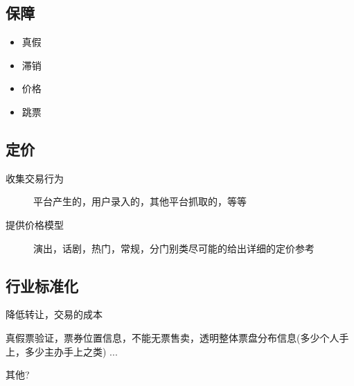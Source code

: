 \documentclass[11pt,a4paper]{article}
\begin{document}
\subsection*{保障}
\label{sec:orgheadline8}
\begin{itemize}
\item 真假
\item 滞销
\item 价格
\item 跳票
\end{itemize}

\subsection*{定价}
\label{sec:orgheadline9}
\begin{description}
\item[{收集交易行为}] 平台产生的，用户录入的，其他平台抓取的，等等
\item[{提供价格模型}] 演出，话剧，热门，常规，分门别类尽可能的给出详细的定价参考
\end{description}

\subsection*{行业标准化}
\label{sec:orgheadline10}

\begin{description}
\item[{推进电子票}] 降低转让，交易的成本
\item[{规范交易行为}] 真假票验证，票券位置信息，不能无票售卖，透明整体票盘分布信息(多少个人手上，多少主办手上之类) ...
\item 其他?
\end{description}
\end{document}
